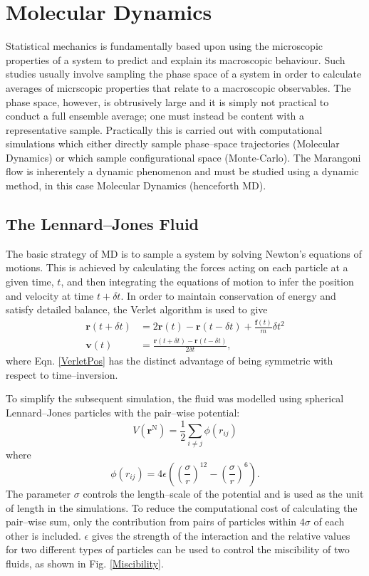 \chapter{Molecular Dynamics}

Statistical mechanics is fundamentally based upon using the microscopic properties of a system to predict and explain its macroscopic behaviour.\cite{StatMech}
Such studies usually involve sampling the phase space of a system in order to calculate averages of micrscopic properties that relate to a macroscopic observables.
The phase space, however, is obtrusively large and it is simply not practical to conduct a full ensemble average; one must instead be content with a representative sample.\cite{Bopp2008}
Practically this is carried out with computational simulations which either directly sample phase--space trajectories (Molecular Dynamics) or which sample configurational space (Monte-Carlo).
The Marangoni flow is inherentely a dynamic phenomenon and must be studied using a dynamic method, in this case Molecular Dynamics (henceforth MD).

\section{The Lennard--Jones Fluid}
The basic strategy of MD is to sample a system by solving Newton's equations of motions.
This is achieved by calculating the forces acting on each particle at a given time, $t$, and then integrating the equations of motion to infer the position and velocity at time $t + \delta t$.
In order to maintain conservation of energy and satisfy detailed balance, the Verlet algorithm is used to give
\begin{align}
\label{VerletPos}
\mathbf{r}( t + \delta t) &= 2 \mathbf{r}(t) - \mathbf{r}(t-\delta t) + \frac{\mathbf{f}(t)}{m} \delta t ^ {2}\\
\label{VerletVel}
\mathbf{v}(t) &= \frac{\mathbf{r}(t+\delta t) - \mathbf{r}(t-\delta t)}{2 \delta t},
\end{align}
where Eqn. \ref{VerletPos} has the distinct advantage of being symmetric with respect to time--inversion.

To simplify the subsequent simulation, the fluid was modelled using spherical Lennard--Jones particles with the pair--wise potential:
\begin{equation}
V \left( \mathbf{r}^{\mathrm{N}} \right) = \frac{1}{2} \sum_{i\neq j} \phi \left( r_{ij} \right)
\end{equation}
where
\begin{equation}
\label{LJ}
\phi \left( r_{ij} \right) = 4 \epsilon \left( \left( \frac{\sigma}{r}\right)^{12} - \left( \frac{\sigma}{r}\right)^{6} \right).
\end{equation}
The parameter $\sigma$ controls the length--scale of the potential and is used as the unit of length in the simulations.
To reduce the computational cost of calculating the pair--wise sum, only the contribution from pairs of particles within $4\sigma$ of each other is included.
$\epsilon$ gives the strength of the interaction and the relative values for two different types of particles can be used to control the miscibility of two fluids, as shown in Fig. \ref{Miscibility}.

